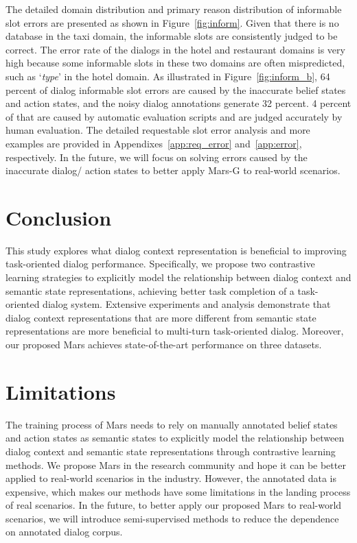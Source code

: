 The detailed domain distribution and primary  reason  distribution of informable slot errors are presented as shown in Figure~\ref{fig:inform}. 
Given that there is no database in the taxi domain, the informable slots are consistently judged to be correct.
The error rate of the dialogs in the hotel and restaurant domains is very high because some informable slots in these two domains are often mispredicted, such as  `\textit{type}' in the hotel domain. As illustrated  in Figure~\ref{fig:inform_b}, 64 percent of dialog informable slot errors are caused by the inaccurate belief states and action states, and the noisy dialog annotations generate 32 percent. 4 percent of that are caused by automatic evaluation scripts and are judged accurately by human evaluation. 
The detailed requestable slot error analysis and 
more examples are provided in  Appendixes~\ref{app:req_error} and~\ref{app:error}, respectively.
In the future, we will focus on solving  errors caused by  the inaccurate dialog/ action states to better apply  Mars-G to real-world scenarios. 

\section{Conclusion}
This study explores what dialog context representation is beneficial to improving  task-oriented dialog performance.
Specifically, we propose two contrastive learning strategies to explicitly model the relationship between dialog context and  semantic state representations,  achieving better task completion of a task-oriented dialog system.
Extensive experiments and analysis demonstrate that dialog context representations that are more different from semantic state representations are more beneficial to multi-turn task-oriented dialog.
Moreover, our proposed  Mars achieves state-of-the-art  performance on three datasets.
  
  \section*{Limitations}
The training process of Mars needs to rely on manually annotated belief states and action states as semantic states to explicitly model the relationship between dialog context and semantic state representations through contrastive learning methods. We propose Mars in the research community and hope it can be better applied to real-world scenarios in the industry. However, the annotated data is expensive, which makes our methods have some limitations in the landing process of real scenarios. In the future, to better apply our proposed Mars to real-world scenarios, we will introduce semi-supervised methods to reduce the dependence on annotated dialog corpus. %
